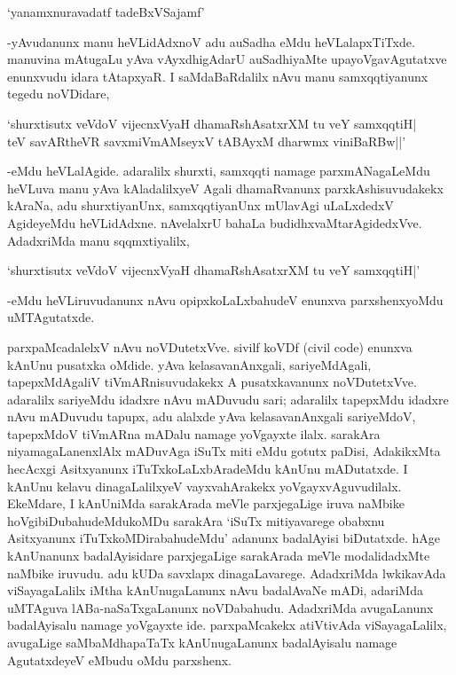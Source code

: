 \begin{shloka}
`yanamxnuravadatf tadeBxVSajamf'
\end{shloka}

-yAvudanunx manu heVLidAdxnoV adu auSadha eMdu heVLalapxTiTxde. manuvina mAtugaLu yAva vAyxdhigAdarU auSadhiyaMte upayoVgavAgutatxve enunxvudu idara tAtapxyaR. I saMdaBaRdalilx nAvu manu samxqqtiyanunx tegedu noVDidare,

\begin{shloka}
`shurxtisutx veVdoV vijecnxVyaH dhamaRshAsatxrXM tu veY samxqqtiH|\\
teV savARtheVR savxmiVmAMseyxV tABAyxM dharwmx viniBaRBw||'
\end{shloka}
 
-eMdu heVLalAgide. adaralilx shurxti, samxqqti namage parxmANagaLeMdu heVLuva manu yAva kAladalilxyeV Agali dhamaRvanunx parxkAshisuvudakekx kAraNa, adu shurxtiyanUnx, samxqqtiyanUnx mUlavAgi uLaLxdedxV AgideyeMdu heVLidAdxne. nAvelalxrU bahaLa budidhxvaMtarAgidedxVve. AdadxriMda manu sqqmxtiyalilx,

\begin{shloka} 
`shurxtisutx veVdoV vijecnxVyaH dhamaRshAsatxrXM tu veY samxqqtiH|'
\end{shloka}

-eMdu heVLiruvudanunx nAvu opipxkoLaLxbahudeV enunxva parxshenxyoMdu uMTAgutatxde.

parxpaMcadalelxV nAvu noVDutetxVve. sivilf koVDf (civil code) enunxva kAnUnu pusatxka oMdide. yAva kelasavanAnxgali, sariyeMdAgali, tapepxMdAgaliV tiVmARnisuvudakekx A pusatxkavanunx noVDutetxVve. adaralilx sariyeMdu idadxre nAvu mADuvudu sari; adaralilx tapepxMdu idadxre nAvu mADuvudu tapupx, adu alalxde yAva kelasavanAnxgali sariyeMdoV, tapepxMdoV tiVmARna mADalu namage yoVgayxte ilalx. sarakAra niyamagaLanenxlAlx mADuvAga iSuTx miti eMdu gotutx paDisi, AdakikxMta hecAcxgi Asitxyanunx iTuTxkoLaLxbAradeMdu kAnUnu mADutatxde. I kAnUnu kelavu dinagaLalilxyeV vayxvahArakekx yoVgayxvAguvudilalx. EkeMdare, I kAnUniMda sarakArada meVle parxjegaLige iruva naMbike hoVgibiDubahudeMdukoMDu sarakAra `iSuTx mitiyavarege obabxnu Asitxyanunx iTuTxkoMDirabahudeMdu' adanunx badalAyisi biDutatxde. hAge kAnUnanunx badalAyisidare parxjegaLige sarakArada meVle modalidadxMte naMbike iruvudu. adu kUDa savxlapx dinagaLavarege. AdadxriMda lwkikavAda viSayagaLalilx iMtha kAnUnugaLanunx nAvu badalAvaNe mADi, adariMda uMTAguva lABa-naSaTxgaLanunx noVDabahudu. AdadxriMda avugaLanunx badalAyisalu namage yoVgayxte ide. parxpaMcakekx atiVtivAda viSayagaLalilx, avugaLige saMbaMdhapaTaTx kAnUnugaLanunx badalAyisalu namage AgutatxdeyeV eMbudu oMdu parxshenx.

